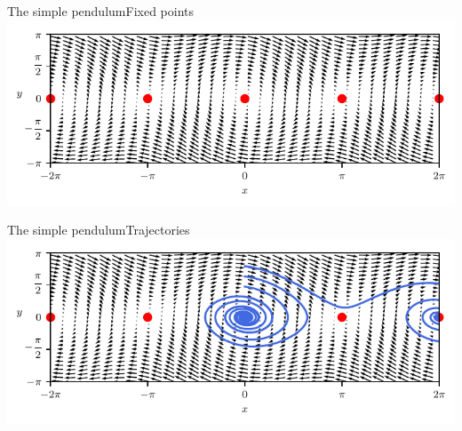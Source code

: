 \documentclass[usenames,dvipsnames,svgnames,10pt,aspectratio=169]{beamer}
\begin{document}
\begin{frame}[t, c]{The simple pendulum}{Fixed points}
	\centering
	\includegraphics[width=.8\textwidth]{pendulum_fixed_points}
\end{frame}

\begin{frame}[t, c]{The simple pendulum}{Trajectories}
	\centering
	\includegraphics[width=.8\textwidth]{pendulum_fixed_trajectories_bis}
\end{frame}
\end{document}
